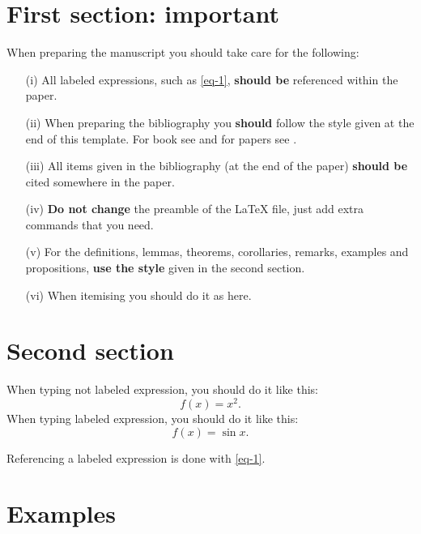 \documentclass[12pt]{amsart}
\numberwithin{equation}{section}
\numberwithin{definition}{section}
\numberwithin{theorem}{section}
\numberwithin{lemma}{section}
\numberwithin{remark}{section}
\numberwithin{corollary}{section}
\numberwithin{proposition}{section}
\numberwithin{equation}{section}
\begin{document}
\maketitle


\section{First section: important}


When preparing the manuscript you should take care for the following:
\begin{itemize}
  \item[(i)] All labeled expressions, such as \eqref{eq-1}, \textbf{should be} referenced within the paper.
%
  \item[(ii)] When preparing the bibliography you \textbf{should} follow the style given at the end of this template. For book see \cite{atkinson} and for papers see \cite{G, V}.
%
  \item[(iii)] All items given in the bibliography (at the end of the paper) \textbf{should be} cited somewhere in the paper.
%
  \item[(iv)] \textbf{Do not change} the preamble of the LaTeX file, just add extra commands that you need.
%
  \item[(v)] For the definitions, lemmas, theorems, corollaries, remarks, examples and propositions, \textbf{use the style} given in the second section.
%
  \item[(vi)] When itemising you should do it as here.
\end{itemize}


\vspace{5mm}
\section{Second section}

When typing not labeled expression, you should do it like this:
\[ f(x) = x^2. \]
When typing labeled expression, you should do it like this:
\begin{equation}\label{eq-1}
f(x) = \sin x.
\end{equation}

Referencing a labeled expression is done with \eqref{eq-1}.



\vspace{5mm}
\section{Examples}
\end{document}

